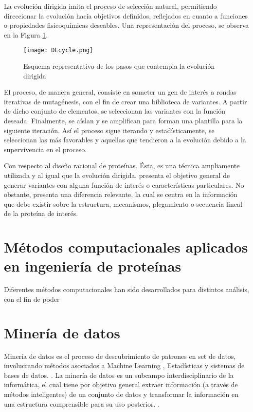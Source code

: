 La evolución dirigida imita el proceso de selección natural, permitiendo direccionar la evolución hacia objetivos definidos, reflejados en cuanto a funciones o propiedades fisicoquímicas deseables. Una representación del proceso, se observa en la Figura \ref{ed}. 


\begin{figure}[!h]
	
	\centering
	\texttt{[image: DEcycle.png]}
	\caption{Esquema representativo de los pasos que contempla la evolución dirigida}
	\label{ed}
\end{figure}

El proceso, de manera general, consiste en someter un gen de interés a rondas iterativas de mutagénesis, con el fin de crear una biblioteca de variantes. A partir de dicho conjunto de elementos, se seleccionan las variantes con la función deseada. Finalmente, se aíslan y se amplifican para forman una plantilla para la siguiente iteración. Así el proceso sigue iterando y estadísticamente, se seleccionan las más favorables y aquellas que tendieron a la evolución debido a la supervivencia en el proceso.

Con respecto al diseño racional de proteínas. Ésta, es una técnica ampliamente utilizada y al igual que la evolución dirigida, presenta el objetivo general de generar variantes con alguna función de interés o características particulares. No obstante, presenta una diferencia relevante, la cual se centra en la información que debe existir sobre la estructura, mecanismos, plegamiento o secuencia lineal de la proteína de interés.

\section{Métodos computacionales aplicados en ingeniería de proteínas}

Diferentes métodos computacionales han sido desarrollados para distintos análisis, con el fin de poder 

\section{Minería de datos}


Minería de datos es el proceso de descubrimiento de patrones en set de datos, involucrando métodos asociados a Machine Learning \cite{michie1994machine}, Estadísticas y sistemas de bases de datos. \cite{hand2006data}. La minería de datos es un subcampo interdisciplinario de la informática, el cual tiene por objetivo general extraer información (a través de métodos inteligentes) de un conjunto de datos y transformar la información en una estructura comprensible para su uso posterior. \cite{fayyad1996knowledge, dunham2006data}. 

